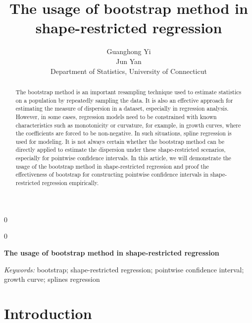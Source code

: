 \documentclass[12pt]{article}
\newcommand{\blind}{0}
\begin{document}
\def\spacingset#1{\renewcommand{\baselinestretch}%
{#1}\small\normalsize} \spacingset{1}



\blind
{
  \title{\bf The usage of bootstrap method in shape-restricted regression}
  \author{Guanghong Yi\\
  Jun Yan\\[1ex]
  Department of Statistics, University of Connecticut\\
}
  \maketitle
} \fi

\blind
{
  \bigskip
  \bigskip
  \bigskip
  \begin{center}
    {\LARGE\bf The usage of bootstrap method in shape-restricted regression}
\end{center}
  \medskip
} \fi

\bigskip
\begin{abstract}
The bootstrap method is an important resampling technique used to estimate 
statistics on a population by repeatedly sampling the data. It is also an 
effective approach for estimating the measure of dispersion in a dataset,
especially in regression analysis. However, in some cases, regression 
models need to be constrained with known characteristics such as monotonicity
or curvature, for example, in growth curves, where the coefficients are 
forced to be non-negative. In such situations, spline regression is used 
for modeling. It is not always certain whether the bootstrap method can 
be directly applied to estimate the dispersion under these shape-restricted
scenarios, especially for pointwise confidence intervals. In this article,
we will demonstrate the usage of the bootstrap method in shape-restricted
regression and proof the effectiveness of bootstrap for constructing 
pointwise confidence intervals in shape-restricted regression empirically.
\end{abstract}

\noindent%
{\it Keywords:}  bootstrap; shape-restricted regression; pointwise confidence interval;
growth curve; splines regression
\vfill

\newpage
\spacingset{1.45} 
\section{Introduction}
\label{sec:intro}
\end{document}

